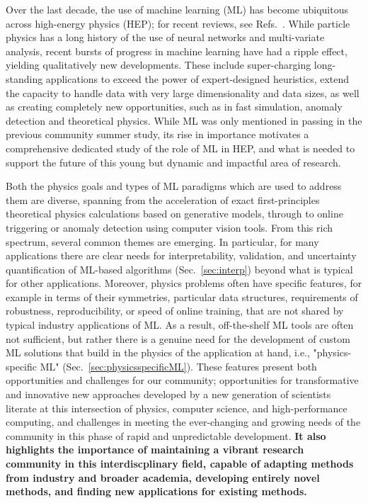 \documentclass[submission,Phys]{SciPost}
\begin{document}
Over the last decade, the use of machine learning (ML) has become ubiquitous across high-energy physics (HEP); for recent reviews, see Refs.~\cite{Guest:2018yhq,Radovic:2018dip,Carleo:2019ptp,Karagiorgi:2021ngt}.  While particle physics has a long history of the use of neural networks and multi-variate analysis, recent bursts of progress in machine learning have had a ripple effect, yielding qualitatively new developments. These include super-charging long-standing applications to exceed the power of expert-designed heuristics, extend the capacity to handle data with very large dimensionality and data sizes, as well as creating completely new opportunities, such as in fast simulation, anomaly detection and theoretical physics.  While ML was only mentioned in passing in the previous community summer study, its rise in importance motivates a comprehensive dedicated study of the role of ML in HEP, and what is needed to support the future of this young but dynamic and impactful area of research.

Both the physics goals and types of ML paradigms which are used to address them are diverse, spanning from the acceleration of exact first-principles theoretical physics calculations based on generative models, through to online triggering or anomaly detection using computer vision tools. From this rich spectrum, several common themes are emerging. In particular, for many applications there are clear needs for interpretability, validation, and uncertainty quantification of ML-based algorithms (Sec.~\ref{sec:interp}) beyond what is typical for other applications. Moreover, physics problems often have specific features, for example in terms of their symmetries, particular data structures, requirements of robustness, reproducibility, or speed of online training, that are not shared by typical industry applications of ML. As a result, off-the-shelf ML tools are often not sufficient, but rather there is a genuine need for the development of custom ML solutions that build in the physics of the application at hand, i.e., "physics-specific ML" (Sec.~\ref{sec:physicsspecificML}). These features present both opportunities and challenges for our community; opportunities for transformative and innovative new approaches developed by a new generation of scientists literate at this intersection of physics, computer science, and high-performance computing, and challenges in meeting the ever-changing and growing needs of the community in this phase of rapid and unpredictable development. {\bf It also highlights the importance of maintaining a vibrant research community in this interdiscplinary field, capable of adapting methods from industry and broader academia, developing entirely novel methods, and finding new applications for existing methods.}
\end{document}
